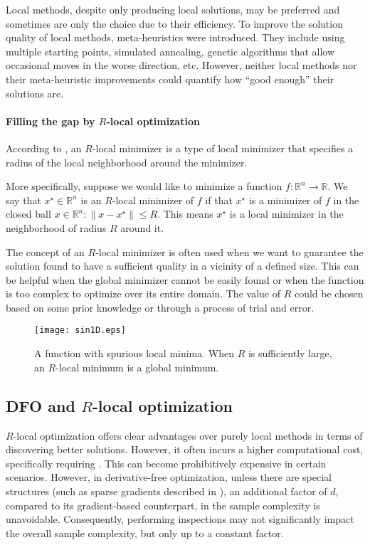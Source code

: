 Local methods, despite only producing local solutions, may be preferred and sometimes are only the choice due to their efficiency. 
To improve the solution quality of local methods, meta-heuristics were introduced. They include using multiple starting points, simulated annealing, genetic algorithms that allow occasional moves in the worse direction, etc.
However, neither local methods nor their meta-heuristic improvements could quantify how ``good enough'' their solutions are.

\paragraph{Filling the gap by $R$-local optimization}
According to \cite{chen2019run}, 
an $R$-local minimizer is a type of local minimizer that specifies a radius of the local neighborhood around the minimizer.

More specifically, suppose we would like to minimize a function $f: \mathbb{R}^n \rightarrow \mathbb{R}$. We say that $x^\star\in\mathbb{R}^n$ is an $R$-local minimizer of $f$ if  that $x^\star$ is a  minimizer of $f$ in the closed ball ${x \in \mathbb{R}^n: \|x - x^\star\| \leq R}$.
This means $x^\star$ is a local minimizer in the neighborhood of radius $R$ around it. 

The concept of an $R$-local minimizer is often used when we want to guarantee the solution found to have a sufficient quality in a vicinity of a defined size. This can be helpful when the global minimizer cannot be easily found or when the function is too complex to optimize over its entire domain. The value of $R$ could be chosen based on some prior knowledge or through a process of trial and error.

\begin{figure}[t]
    \centering
    \texttt{[image: sin1D.eps]}
    \caption{A function with spurious local minima. When $R$ is sufficiently large, an $R$-local minimum is a global minimum.}
    \label{fig: 1D quad + sin}
\end{figure}

\subsection{DFO and $R$-local optimization}
$R$-local optimization offers clear advantages over purely local methods in terms of discovering better solutions. However, it often incurs a higher computational cost, specifically requiring .
This can become prohibitively expensive in certain scenarios. However, in derivative-free optimization, unless there are special structures (such as sparse gradients described in \cite{cai2020zeroth}), an additional factor of $d$, compared to its gradient-based counterpart, in the sample complexity is unavoidable. Consequently, performing inspections may not significantly impact the overall sample complexity, but only up to a constant factor.

